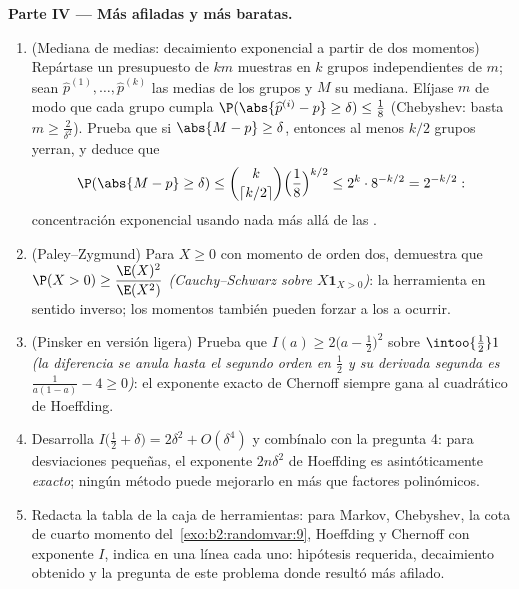 \begin{problem}
\medskip
\noindent\textbf{Parte IV --- Más afiladas y más baratas.}
\begin{enumerate}[resume]
  \item (Mediana de medias: decaimiento exponencial a partir de dos
        momentos) Repártase un presupuesto de $km$ muestras en $k$
        grupos independientes de $m$; sean $\widehat p^{(1)}, \dots,
        \widehat p^{(k)}$ las medias de los grupos y $M$ su mediana.
        Elíjase $m$ de modo que cada grupo cumpla $\P(\abs{\widehat
        p^{(i)} - p} \geq \delta) \leq \frac18$ (Chebyshev: basta $m
        \geq \frac2{\delta^2}$). Prueba que si $\abs{M - p} \geq
        \delta$, entonces al menos $k/2$ grupos yerran, y deduce que
        \[
        \P(\abs{M - p} \geq \delta)
        \leq \binom{k}{\lceil k/2\rceil}\Bigl(\frac18
        \Bigr)^{k/2}
        \leq 2^k\cdot 8^{-k/2} = 2^{-k/2} :
        \]
        concentración exponencial usando nada más allá de las
        .
  \item (Paley--Zygmund) Para $X \geq 0$ con momento de orden dos,
        demuestra que $\P(X > 0) \geq \dfrac{\E(X)^2}{\E(X^2)}$
        \emph{(Cauchy--Schwarz sobre $X\mathbf 1_{X>0}$)}: la
        herramienta en sentido inverso; los momentos también pueden
        forzar a los  a ocurrir.
  \item (Pinsker en versión ligera) Prueba que $I(a) \geq 2\bigl(a -
        \tfrac12\bigr)^2$ sobre $\intoo{\frac12}1$ \emph{(la
        diferencia se anula hasta el segundo orden en $\frac12$ y su
        derivada segunda es $\frac1{a(1-a)} - 4 \geq 0$)}: el
        exponente exacto de Chernoff siempre gana al cuadrático de
        Hoeffding.
  \item Desarrolla $I\bigl(\tfrac12 + \delta\bigr) = 2\delta^2 +
        O(\delta^4)$ y combínalo con la pregunta 4: para
        desviaciones pequeñas, el exponente $2n\delta^2$ de Hoeffding
        es asintóticamente \emph{exacto}; ningún método puede
        mejorarlo en más que factores polinómicos.
  \item Redacta la tabla de la caja de herramientas: para Markov,
        Chebyshev, la cota de cuarto momento del~\cref{exo:b2:randomvar:9}, Hoeffding y Chernoff con
        exponente $I$, indica en una línea cada uno: hipótesis
        requerida, decaimiento obtenido y la pregunta de este
        problema donde resultó más afilado.
\end{enumerate}


\end{problem}
